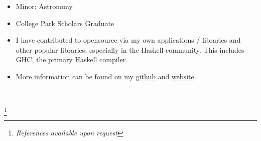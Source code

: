 \documentclass[10pt,a4paper,ragged2e,withhyper]{altacv}
\newcommand\blfootnote[1]{%
  \begingroup
  \renewcommand\thefootnote{}\footnote{#1}%
  \addtocounter{footnote}{-1}%
  \endgroup
}
\begin{document}
\begin{paracol}{2}
\switchcolumn



\begin{itemize}
\item Minor: Astronomy
\item College Park Scholars Graduate
\end{itemize}


\begin{itemize}
    \item I have contributed to opensource via my own applications / libraries and other popular libraries, especially in the Haskell community. This includes GHC, the primary Haskell compiler.
    \item More information can be found on my \href{https://www.github.com/tbidne}{github} and \href{https://tbidne.github.io}{website}.
\end{itemize}


 \\

\end{paracol}

\blfootnote{\textit{References available upon request}}
\end{document}
